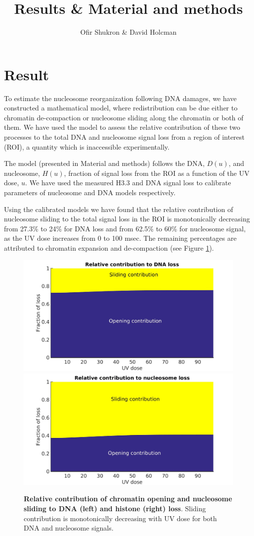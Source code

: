 \documentclass[12pt]{article}
\begin{document}
	
	\title{Results \& Material and methods}
	\author{Ofir Shukron \& David Holcman}
	\maketitle
	
	\section{Result}
	To estimate the nucleosome reorganization following DNA damages, we have
	constructed a mathematical model, where redistribution can be due either to chromatin de-compaction or nucleosome sliding along the chromatin or both of them. We have used the model to assess the relative contribution of these two processes to the total DNA and nucleosome signal loss from a region of interest (ROI), a quantity which is inaccessible experimentally.
	
	The model (presented in Material and methods) follows the DNA, $D(u)$,
	and nucleosome, $H(u)$, fraction of signal loss from the ROI as a function of
	the UV dose, $u$. We have used the measured H3.3 and DNA signal loss to
	calibrate parameters of nucleosome and DNA models respectively.
	
	Using the calibrated models we have found that the relative contribution
	of nucleosome sliding to the total signal loss in the ROI is monotonically
	decreasing from 27.3\% to 24\% for DNA loss and from 62.5\% to 60\% for nucleosome signal,
	as the UV dose increases from 0 to 100 msec. The remaining percentages are
	attributed to chromatin expansion and de-compaction (see Figure \ref{fig:relatiiveContributionToLoss}).
	
	\begin{figure}[H]
		\includegraphics[width=0.5\linewidth, height=0.3\textheight]{relatiiveContributionToDNALoss}
		\includegraphics[width=0.5\linewidth, height=0.3\textheight]{relativeContributionToHistoneLoss}
		\caption{\textbf{Relative contribution of chromatin opening and nucleosome sliding to DNA (left) and histone (right) loss}. Sliding contribution is monotonically decreasing with UV dose for both DNA and nucleosome signals.}
		\label{fig:relatiiveContributionToLoss}
	\end{figure}
	
\end{document}
